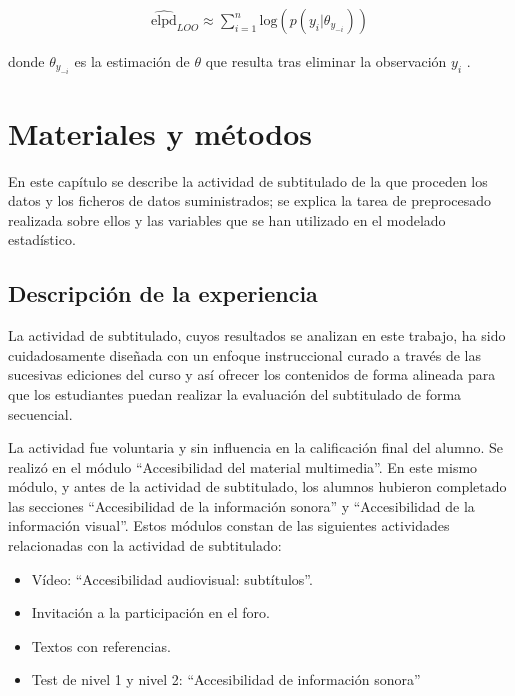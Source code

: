 \documentclass[
  12pt,
  a4paper,
  extrafontsizes,
  onecolumn,
  openright,
  table]{memoir}
\providecommand{\tightlist}{%
  \setlength{\itemsep}{0pt}\setlength{\parskip}{0pt}}\usepackage{longtable,booktabs,array}
\begin{document}
\[
\begin{aligned}
\widehat{\mathrm{elpd}}_{LOO} \approx \sum_{i=1}^{n} \mathrm{log} (p(y_{i} | \theta_{y_{-i}}))
\end{aligned}
\]

donde \(\theta_{y_{-i}}\) es la estimación de \(\theta\) que resulta
tras eliminar la observación \(y_{i}\) \autocite[ver][
pp.~175-176]{gelman2013}.


\hypertarget{sec-metodo}{%
\chapter{Materiales y métodos}\label{sec-metodo}}

En este capítulo se describe la actividad de subtitulado de la que
proceden los datos y los ficheros de datos suministrados; se explica la
tarea de preprocesado realizada sobre ellos y las variables que se han
utilizado en el modelado estadístico.

\hypertarget{sec-desc}{%
\section{Descripción de la experiencia}\label{sec-desc}}

La actividad de subtitulado, cuyos resultados se analizan en este
trabajo, ha sido cuidadosamente diseñada con un enfoque instruccional
curado a través de las sucesivas ediciones del curso y así ofrecer los
contenidos de forma alineada para que los estudiantes puedan realizar la
evaluación del subtitulado de forma secuencial.

La actividad fue voluntaria y sin influencia en la calificación final
del alumno. Se realizó en el módulo \enquote{Accesibilidad del material
multimedia}. En este mismo módulo, y antes de la actividad de
subtitulado, los alumnos hubieron completado las secciones
\enquote{Accesibilidad de la información sonora} y
\enquote{Accesibilidad de la información visual}. Estos módulos constan
de las siguientes actividades relacionadas con la actividad de
subtitulado:

\begin{itemize}
\tightlist
\item
  Vídeo: \enquote{Accesibilidad audiovisual: subtítulos}.
\item
  Invitación a la participación en el foro.
\item
  Textos con referencias.
\item
  Test de nivel 1 y nivel 2: \enquote{Accesibilidad de información
  sonora}
\end{itemize}
\end{document}

